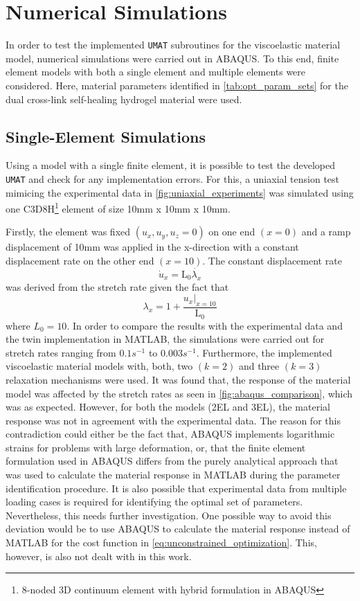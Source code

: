 \chapter{Numerical Simulations}%
\label{chapter:five}
In order to test the implemented \texttt{UMAT} subroutines  for the viscoelastic material model, numerical simulations were carried out in ABAQUS. To this end, finite element models with both a single element and multiple elements were considered. Here, material parameters identified in \cref{tab:opt_param_sets} for the dual cross-link self-healing hydrogel material were used.

\section{Single-Element Simulations}
Using a model with a single finite element, it is possible to test the developed \texttt{UMAT} and check for any implementation errors. For this, a uniaxial tension test mimicing the experimental data in \cref{fig:uniaxial_experiments} was simulated using one C3D8H\footnote[1]{8-noded 3D continuum element with hybrid formulation in ABAQUS} element of size 10mm x 10mm x 10mm.

Firstly, the element was fixed \((u_{x}, u_{y}, u_{z} = 0)\) on one end \((x=0)\) and a ramp displacement of 10mm was applied in the x-direction with a constant displacement rate on the other end \((x=10)\). The constant displacement rate 
\begin{equation}
    \dot{u}_{x} = \mathrm{L}_{0} \dot{\lambda_{x}}
    \label{eq:displacement_rate}
\end{equation}
was derived from the stretch rate given the fact that
\begin{equation}
     \lambda_{x} = 1 + \dfrac{{u_{x}|}_{x=10}}{\mathrm{L}_{0}}
\end{equation}  where \(L_{0} = 10\). 
In order to compare the results with the experimental data and the twin implementation in MATLAB, the simulations were carried out for stretch rates ranging from \(0.1s^{-1}\) to \(0.003s^{-1}\). Furthermore, the implemented viscoelastic material models with, both, two \((k=2)\) and three \((k=3)\) relaxation mechanisms were used. It was found that, the response of the material model was affected by the stretch rates as seen in \cref{fig:abaqus_comparison}, which was as expected. However, for both the models (2EL and 3EL), the material response was not in agreement with the experimental data. The reason for this contradiction could either be the fact that, ABAQUS implements logarithmic strains for problems with large deformation, or, that the finite element formulation used in ABAQUS differs from the purely analytical approach that was used to calculate the material response in MATLAB during the parameter identification procedure. It is also possible that experimental data from multiple loading cases is required for identifying the optimal set of parameters\cite{Kleuter2007Jul}. Nevertheless, this needs further investigation. One possible way to avoid this deviation would be to use ABAQUS to calculate the material response instead of MATLAB for the cost function in \cref{eq:unconstrained_optimization}. This, however, is also not dealt with in this work.

